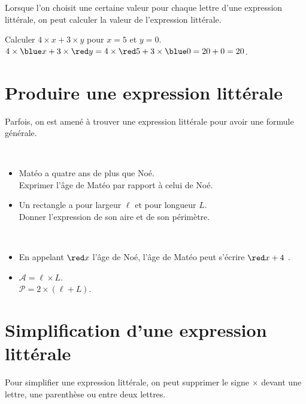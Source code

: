\bigskip

Lorsque l'on choisit une certaine valeur pour chaque lettre d'une expression littérale, on peut calculer la valeur de l'expression littérale.  

\begin{exemple}[0.5]
   Calculer $4\times x+3\times y$ pour $x=5$ et $y =0$. \\
   \correction
      $4\times{\blue x}+3\times{\red y} =4\times{\red 5}+3\times{\blue0} =20+0 =20$.
\end{exemple}


\section{Produire une expression littérale}

Parfois, on est amené à trouver une expression littérale pour avoir une formule générale.

\begin{exemple}[0.55]
\ \\ [-10mm]
   \begin{itemize}
      \item Matéo a quatre ans de plus que Noé. \\
         Exprimer l'âge de Matéo par rapport à celui de Noé.
      \item Un rectangle a pour largeur $\ell$ et pour longueur $L$. \\
         Donner l'expression de son aire et de son périmètre.
   \end{itemize}
   \correction
      \ \\ [-10mm]
      \begin{itemize}
         \item En appelant \og $\red x$ \fg{} l'âge de Noé, l'âge de Matéo peut s'écrire \og ${\red x}+4$ \fg.
         \item $\mathcal{A} =\ell\times L$. \\
         $\mathcal{P} =2\times(\ell+L)$.
      \end{itemize}
\end{exemple}

\medskip


\section{Simplification d'une expression littérale}

Pour simplifier une expression littérale, on peut supprimer le signe \og $\times$ \fg{} devant une lettre, une parenthèse ou entre deux lettres. 

